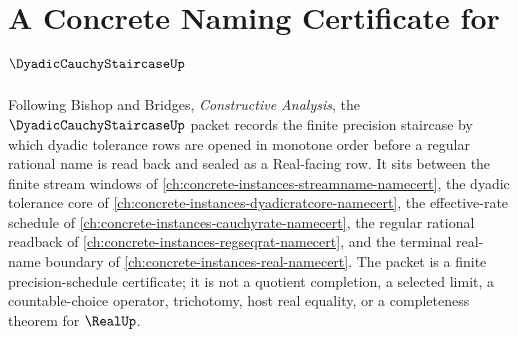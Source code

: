 \chapter{A Concrete Naming Certificate for $\DyadicCauchyStaircaseUp$}
\label{ch:concrete-instances-dyadic-cauchy-staircase-namecert}

Following Bishop and Bridges, \emph{Constructive Analysis}, the $\DyadicCauchyStaircaseUp$ packet records the finite precision staircase by which dyadic tolerance rows are opened in monotone order before a regular rational name is read back and sealed as a Real-facing row. It sits between the finite stream windows of \autoref{ch:concrete-instances-streamname-namecert}, the dyadic tolerance core of \autoref{ch:concrete-instances-dyadicratcore-namecert}, the effective-rate schedule of \autoref{ch:concrete-instances-cauchyrate-namecert}, the regular rational readback of \autoref{ch:concrete-instances-regseqrat-namecert}, and the terminal real-name boundary of \autoref{ch:concrete-instances-real-namecert}. The packet is a finite precision-schedule certificate; it is not a quotient completion, a selected limit, a countable-choice operator, trichotomy, host real equality, or a completeness theorem for $\RealUp$.

